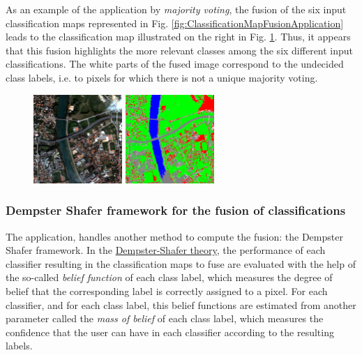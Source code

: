 As an example of the  application by 
\emph{majority voting}, the fusion of the six input classification maps 
represented in Fig. \ref{fig:ClassificationMapFusionApplication} leads to the 
classification map illustrated on the right in Fig. \ref{fig:ClassificationMapFusionApplicationMV}. 
Thus, it appears that this fusion highlights the more relevant classes among the six  
different input classifications. The white parts of the fused image correspond to 
the undecided class labels, i.e. to pixels for which there is not a unique 
majority voting.


\begin{figure}[!h]
  \center
  \includegraphics[width=0.3\textwidth]{../Art/MonteverdiImages/classification_chain_inputimage.jpg}
  \includegraphics[width=0.3\textwidth]{../Art/MonteverdiImages/QB_1_ortho_MV_C123456_CM.png}
  \label{fig:ClassificationMapFusionApplicationMV}
\end{figure}


\subsubsection{Dempster Shafer framework for the fusion of classifications}

The  application, handles another method to 
compute the fusion: the Dempster Shafer framework. 
In the \href{http://en.wikipedia.org/wiki/Dempster\%E2\%80\%93Shafer_theory}{Dempster-Shafer theory}, 
the performance of each classifier resulting in the classification maps to fuse are 
evaluated with the help of the so-called \emph{belief function} of each class label, 
which measures the degree of belief that the corresponding label is correctly assigned 
to a pixel. For each classifier, and for each class label, this belief functions are 
estimated from another parameter called the \emph{mass of belief} of each class label, 
which measures the confidence that the user can have in each classifier according to 
the resulting labels.

